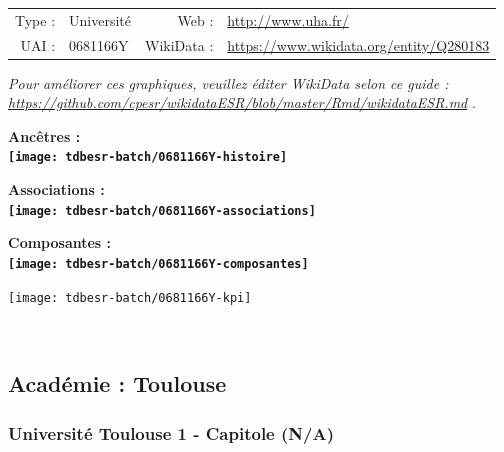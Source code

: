 \documentclass[12pt,french,]{article}
\begin{document}
\begin{tabular*}{\textwidth}{rp{5cm}rl}  
\hline  
Type : & Université & Web : &\href{http://www.uha.fr/}{http://www.uha.fr/} \\  
UAI : & 0681166Y & WikiData : & \href{https://www.wikidata.org/entity/Q280183}{https://www.wikidata.org/entity/Q280183} \\  
\hline  
\end{tabular*}

\textit{\scriptsize Pour améliorer ces graphiques, veuillez éditer WikiData selon ce guide :  \href{https://github.com/cpesr/wikidataESR/blob/master/Rmd/wikidataESR.md}{https://github.com/cpesr/wikidataESR/blob/master/Rmd/wikidataESR.md}}
.

\vspace{1cm}  
\begin{minipage}[b]{0.50\textwidth}\begin{center} \bf Ancêtres : \\  
\texttt{[image: tdbesr-batch/0681166Y-histoire]} \end{center}\end{minipage}\begin{minipage}[b]{0.50\textwidth}\begin{center} \bf Associations : \\  
\texttt{[image: tdbesr-batch/0681166Y-associations]} \end{center}\end{minipage}

\hrulefill

\begin{center} \bf Composantes : \\  
\texttt{[image: tdbesr-batch/0681166Y-composantes]} \end{center}

\begin{center}\texttt{[image: tdbesr-batch/0681166Y-kpi]} \end{center}\checkoddpage

\ifoddpage \fi ~\newpage  

\hypertarget{acaduxe9mie-toulouse}{%
\subsection{Académie : Toulouse}\label{acaduxe9mie-toulouse}}

\hypertarget{universituxe9-toulouse-1---capitole-na}{%
\subsubsection{Université Toulouse 1 - Capitole
(N/A)}\label{universituxe9-toulouse-1---capitole-na}}
\end{document}
